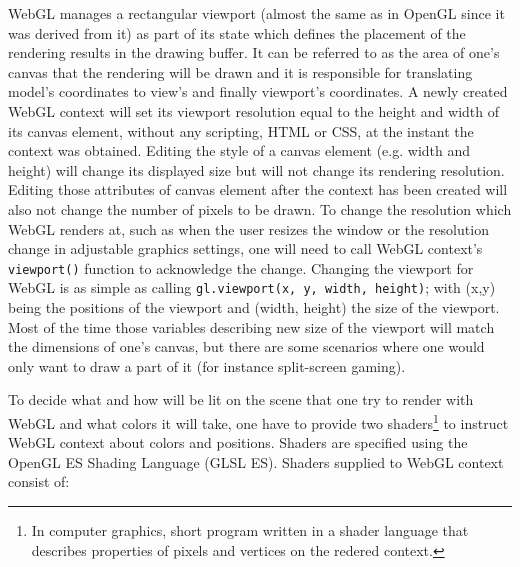 WebGL manages a rectangular viewport (almost the same as in OpenGL since it was derived from it) as part of its state which defines the placement of the rendering results in the drawing buffer.
It can be referred to as the area of one's canvas that the rendering will be drawn and it is responsible for translating model's coordinates to view's and finally viewport's coordinates.
A newly created WebGL context will set its viewport resolution equal to the height and width of its canvas element, without any scripting, HTML or CSS, at the instant the context was obtained.
\newline Editing the style of a canvas element (e.g. width and height) will change its displayed size but will not change its rendering resolution.
Editing those attributes of canvas element after the context has been created will also not change the number of pixels to be drawn.
\newline To change the resolution which WebGL renders at, such as when the user resizes the window or the resolution change in adjustable graphics settings, one will need to call WebGL context's \texttt{viewport()} function to acknowledge the change.
Changing the viewport for WebGL is as simple as calling \texttt{gl.viewport(x, y, width, height)}; with (x,y) being the positions of the viewport and (width, height) the size of the viewport. 
Most of the time those variables describing new size of the viewport will match the dimensions of one's canvas, but there are some scenarios where one would only want to draw a part of it (for instance split-screen gaming).

To decide what and how will be lit on the scene that one try to render with WebGL and what colors it will take, one have to provide two shaders\footnote{In computer graphics, short program written in a shader language that describes properties of pixels and vertices on the redered context.} to instruct WebGL context about colors and positions.
\newline Shaders are specified using the OpenGL ES Shading Language\cite{glsl_es_manpages} (GLSL ES).
Shaders supplied to WebGL context consist of:
\clearpage


